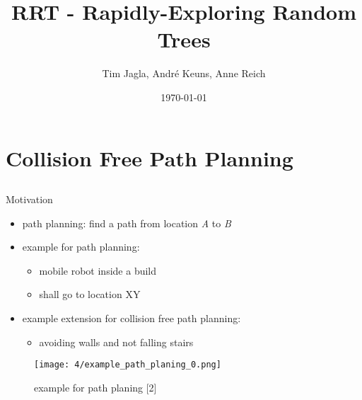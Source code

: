 \documentclass[%
  professionalfonts,%
  xcolor={%
    usenames,%
    dvipsnames,%
    svgnames,%
    table,%
    hyperref%
  }%
]{beamer}
\title{RRT - Rapidly-Exploring Random Trees}
\author{Tim Jagla, André Keuns, Anne Reich}
\institute[FIN]{Otto-von-Guericke-Universität Magdeburg}
\date{\today}
\begin{document}
  \begin{frame}
    \titlepage
  \end{frame}
  
  \section{Collision Free Path Planning}
    \begin{frame}
      \huge{}
    \end{frame}
    
    \subsection*{}
      \begin{frame}{Motivation}
        \begin{itemize}
          \item path planning: find a path from location \emph{A} to \emph{B}
          \item example for path planning:
          \begin{itemize}
            \item mobile robot inside a build
            \item shall go to location XY
          \end{itemize}
          \item example extension for collision free path planning:
          \begin{itemize}
            \item avoiding walls and not falling stairs
          \end{itemize}
        \end{itemize}
        
        \begin{figure}[h]
          \texttt{[image: 4/example\_path\_planing\_0.png]}
          \caption{example for path planing [2]}
          \label{fig:example path planing 0}
        \end{figure}
      \end{frame}
    
\end{document}
